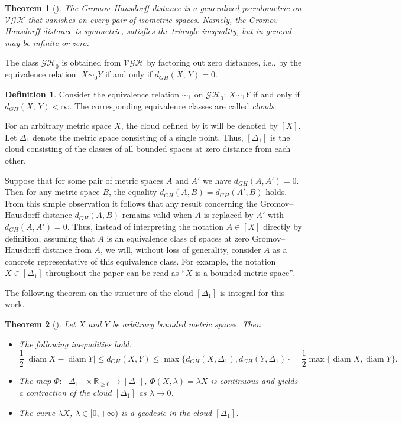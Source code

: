 \documentclass{article}
\newtheorem{theorem}{Theorem}[]
\theoremstyle{definition}
\newtheorem{definition}{Definition}[]
\theoremstyle{plain}
\newcommand{\diam}{\operatorname{diam}}
\renewcommand{\:}{\colon}
\newcommand{\0}{\emptyset}
\renewcommand{\(}{\rom(}
\renewcommand{\)}{\rom)}
\newcommand{\R}{\mathbb{R}}
\begin{document}
\begin{theorem}[\cite{BBI}]
The Gromov--Hausdorff distance is a generalized pseudometric on $\mathcal{VGH}$ that vanishes on every pair of isometric spaces. Namely, the Gromov--Hausdorff distance is symmetric, satisfies the triangle inequality, but in general may be infinite or zero.
\end{theorem}

The class $\mathcal{GH}_0$ is obtained from $\mathcal{VGH}$ by factoring out zero distances, i.e., by the equivalence relation: $X\sim_0 Y$ if and only if $d_{GH}(X,\,Y) = 0$.

\begin{definition}
Consider the equivalence relation $\sim_1$ on $\mathcal{GH}_0$: $X\sim_1 Y$ if and only if $d_{GH}(X,\,Y) < \infty$. The corresponding equivalence classes are called \emph{clouds}.
\end{definition}

For an arbitrary metric space $X$, the cloud defined by it will be denoted by $[X]$. Let $\Delta_1$ denote the metric space consisting of a single point. Thus, $[\Delta_1]$ is the cloud consisting of the classes of all bounded spaces at zero distance from each other.

Suppose that for some pair of metric spaces $A$ and $A'$ we have $d_{GH}(A, A') = 0$. Then for any metric space $B$, the equality $d_{GH}(A, B) = d_{GH}(A', B)$ holds. From this simple observation it follows that any result concerning the Gromov--Hausdorff distance $d_{GH}(A, B)$ remains valid when $A$ is replaced by $A'$ with $d_{GH}(A, A') = 0$. Thus, instead of interpreting the notation $A\in [X]$ directly by definition, assuming that $A$ is an equivalence class of spaces at zero Gromov--Hausdorff distance from $A$, we will, without loss of generality, consider $A$ as a concrete representative of this equivalence class. For example, the notation $X\in[\Delta_1]$ throughout the paper can be read as ``$X$ is a bounded metric space''.

The following theorem on the structure of the cloud $[\Delta_1]$ is integral for this work.

\begin{theorem}[\cite{BBI}] \label{thm: boundedcloud}
Let $X$ and $Y$ be arbitrary bounded metric spaces. Then
\begin{itemize}
\item The following inequalities hold:
$$\frac{1}{2}\bigl|\diam X - \diam Y\bigr|\le d_{GH}(X, Y)\le \max\bigl\{d_{GH}(X, \Delta_1), d_{GH}(Y, \Delta_1)\bigr\} = \frac{1}{2}\max\bigl\{\diam X, \diam Y\bigr\}.$$
\item The map $\Phi\:[\Delta_1]\times \R_{\ge 0}\to [\Delta_1]$, $\Phi(X, \lambda) = \lambda X$ is continuous and yields a contraction of the cloud $[\Delta_1]$ as $\lambda \to 0$.
\item The curve $\lambda X$, $\lambda\in[0, +\infty)$ is a geodesic in the cloud $[\Delta_1]$.
\end{itemize}   
\end{theorem}
\end{document}
